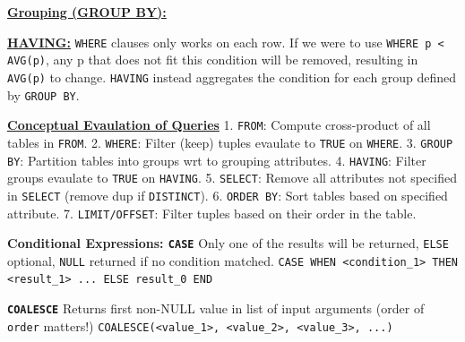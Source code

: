 \documentclass[10pt,landscape]{article}
\begin{document}
\begin{multicols*}{3}
\textbf{\underline{Grouping (GROUP BY):}} 

\textbf{\underline{HAVING:}} \verb|WHERE| clauses only works on each row. If we were to use \verb|WHERE p < AVG(p)|, any p that does not fit this condition
will be removed, resulting in \verb|AVG(p)| to change. \verb|HAVING| instead aggregates the condition for each group defined by \verb|GROUP BY|.

\textbf{\underline{Conceptual Evaulation of Queries}}
1. \verb|FROM|: Compute cross-product of all tables in \verb|FROM|.
2. \verb|WHERE|: Filter (keep) tuples evaulate to \verb|TRUE| on \verb|WHERE|.
3. \verb|GROUP BY|: Partition tables into groups wrt to grouping attributes.
4. \verb|HAVING|: Filter groups evaulate to \verb|TRUE| on \verb|HAVING|.
5. \verb|SELECT|: Remove all attributes not specified in \verb|SELECT| (remove dup if \verb|DISTINCT|).
6. \verb|ORDER BY|: Sort tables based on specified attribute.
7. \verb|LIMIT/OFFSET|: Filter tuples based on their order in the table.

\cprotect\textbf{Conditional Expressions: \verb|CASE|}
Only one of the results will be returned, \verb|ELSE| optional, \verb|NULL| returned if no condition matched.
\verb|CASE WHEN <condition_1> THEN <result_1> ... ELSE result_0 END|


\cprotect\textbf{\verb|COALESCE|}
Returns first non-NULL value in list of input arguments (order of \verb|order| matters!) \verb|COALESCE(<value_1>, <value_2>, <value_3>, ...)|


\end{multicols*}
\end{document}
